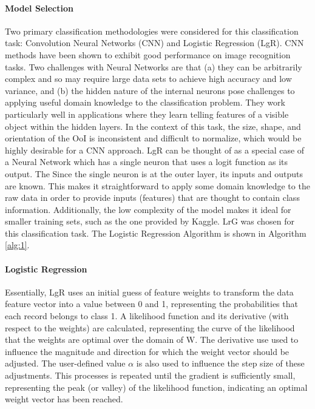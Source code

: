 \documentclass[fleqn,10pt]{SelfArx} %
\begin{document}
\paragraph{Model Selection} Two primary classification methodologies were considered for this classification task: Convolution Neural Networks (CNN) and Logistic Regression (LgR).  CNN methods have been shown to exhibit good performance on image recognition tasks. \cite{NIPS2012_4824} \cite{behnke}  Two challenges with Neural Networks are that (a) they can be arbitrarily complex and so may require large data sets to achieve high accuracy and low variance, and (b) the hidden nature of the internal neurons pose challenges to applying useful domain knowledge to the classification problem.  They work particularly well in applications where they learn telling features of a visible object within the hidden layers.  In the context of this task, the size, shape, and orientation of the OoI is inconsistent and difficult to normalize, which would be highly desirable for a CNN approach. \cite{lecun} LgR can be thought of as a special case of a Neural Network which has a single neuron that uses a logit function as its output.  The Since the single neuron is at the outer layer, its inputs and outputs are known.  This makes it straightforward to apply some domain knowledge to the raw data in order to provide inputs (features) that are thought to contain class information.  Additionally, the low complexity of the model makes it ideal for smaller training sets, such as the one provided by Kaggle. \cite{mccullagh} \cite{lim} LrG was chosen for this classification task.  The Logistic Regression Algorithm is shown in Algorithm \ref{alg:1}.  

\paragraph{Logistic Regression} Essentially, LgR uses an initial guess of feature weights to transform the data feature vector into a value between 0 and 1, representing the probabilities that each record belongs to class 1.  A likelihood function and its derivative (with respect to the weights) are calculated, representing the curve of the likelihood that the weights are optimal over the domain of W.  The derivative use used to influence the magnitude and direction for which the weight vector should be adjusted.  The user-defined value $\alpha$ is also used to influence the step size of these adjustments.  This processes is repeated until the gradient is sufficiently small, representing the peak (or valley) of the likelihood function, indicating an optimal weight vector has been reached.
\end{document}
